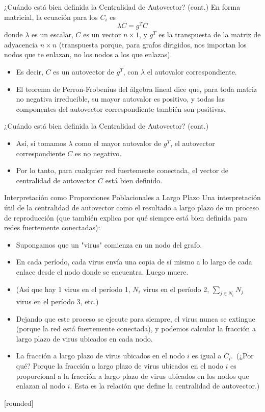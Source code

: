 \documentclass[11pt]{beamer}
\begin{document}
\begin{frame}{¿Cuándo está bien definida la Centralidad de Autovector? (cont.)}
 En forma matricial, la ecuación para los $C_{i}$ es
$$
\lambda C=g^{T} C
$$
donde $\lambda$ es un escalar, $C$ es un vector $n \times 1$, y $g^{T}$ es la transpuesta de la matriz de adyacencia $n \times n$ (transpuesta porque, para grafos dirigidos, nos importan los nodos que te enlazan, no los nodos a los que enlazas).
\begin{itemize}
\item Es decir, $C$ es un autovector de $g^{T}$, con $\lambda$ el autovalor correspondiente.
\item El teorema de Perron-Frobenius del álgebra lineal dice que, para toda matriz no negativa irreducible, su mayor autovalor es positivo, y todas las componentes del autovector correspondiente también son positivas.
\end{itemize}
\end{frame}
\begin{frame}{¿Cuándo está bien definida la Centralidad de Autovector? (cont.)}
\begin{itemize}
\item Así, si tomamos $\lambda$ como el mayor autovalor de $g^{T}$, el autovector correspondiente $C$ es no negativo.
\item Por lo tanto, para cualquier red fuertemente conectada, el vector de centralidad de autovector $C$ está bien definido.
\end{itemize}
\end{frame}

\begin{frame}{Interpretación como Proporciones Poblacionales a Largo Plazo}\small
Una interpretación útil de la centralidad de autovector como el resultado a largo plazo de un proceso de reproducción (que también explica por qué siempre está bien definida para redes fuertemente conectadas):
\begin{itemize}
\item Supongamos que un "virus" comienza en un nodo del grafo.
\item En cada período, cada virus envía una copia de sí mismo a lo largo de cada enlace desde el nodo donde se encuentra. Luego muere.
\item (Así que hay 1 virus en el período 1, $N_{i}$ virus en el período 2, $\sum_{j \in N_{i}} N_{j}$ virus en el período 3, etc.)
\item Dejando que este proceso se ejecute para siempre, el virus nunca se extingue (porque la red está fuertemente conectada), y podemos calcular la fracción a largo plazo de virus ubicados en cada nodo.
\item La fracción a largo plazo de virus ubicados en el nodo $i$ es igual a $C_{i}$.\
(¿Por qué? Porque la fracción a largo plazo de virus ubicados en el nodo $i$ es proporcional a la fracción a largo plazo de virus ubicados en los nodos que enlazan al nodo $i$. Esta es la relación que define la centralidad de autovector.)
\end{itemize}
\end{frame}
[rounded]%
\end{document}
